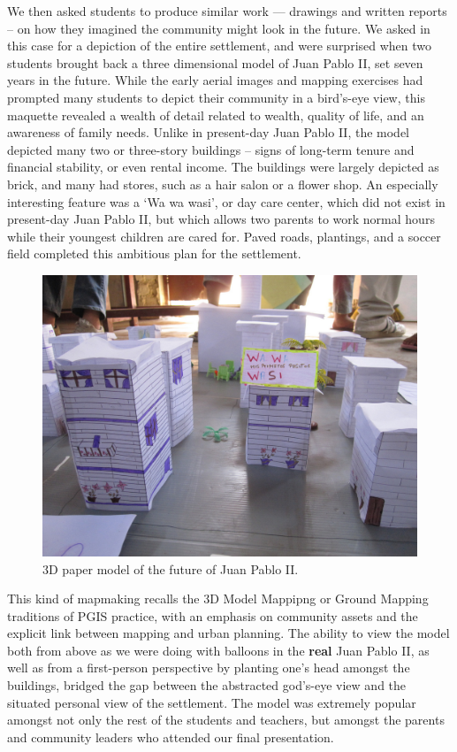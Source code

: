\documentclass[11pt,oneside,notitlepage]{report}
\begin{document}
We then asked students to produce similar work --- drawings and written reports -- on how they imagined the community might look in the future. We asked in this case for a depiction of the entire settlement, and were surprised when two students brought back a three dimensional model of Juan Pablo II, set seven years in the future. While the early aerial images and mapping exercises had prompted many students to depict their community in a bird's-eye view, this maquette revealed a wealth of detail related to wealth, quality of life, and an awareness of family needs. Unlike in present-day Juan Pablo II, the model depicted many two or three-story buildings -- signs of long-term tenure and financial stability, or even rental income. The buildings were largely depicted as brick, and many had stores, such as a hair salon or a flower shop. An especially interesting feature was a `Wa wa wasi', or day care center, which did not exist in present-day Juan Pablo II, but which allows two parents to work normal hours while their youngest children are cared for. Paved roads, plantings, and a soccer field completed this ambitious plan for the settlement.

\begin{figure}[h]
  \begin{center}
	\includegraphics[width=1\textwidth]{images/juan-pablo-maqueta.jpg}
	\caption{3D paper model of the future of Juan Pablo II.}
  \end{center}
\end{figure}

This kind of mapmaking recalls the 3D Model Mappipng or Ground Mapping traditions of \ac{PGIS} practice, with an emphasis on community assets and the explicit link between mapping and urban planning. The ability to view the model both from above as we were doing with balloons in the \textbf{real} Juan Pablo II, as well as from a first-person perspective by planting one's head amongst the buildings, bridged the gap between the abstracted god's-eye view and the situated personal view of the settlement. The model was extremely popular amongst not only the rest of the students and teachers, but amongst the parents and community leaders who attended our final presentation. 
\end{document}

